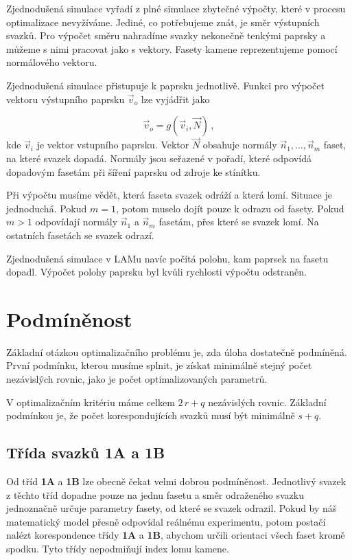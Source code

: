 Zjednodušená simulace vyřadí z plné simulace zbytečné výpočty, které v procesu optimalizace nevyžíváme. 
Jediné, co potřebujeme znát, je směr výstupních svazků. Pro výpočet směru nahradíme svazky nekonečně tenkými paprsky a můžeme s nimi pracovat jako s vektory. Fasety kamene reprezentujeme pomocí normálového vektoru. 

Zjednodušená simulace přistupuje k paprsku jednotlivě. Funkci pro výpočet vektoru vý\-stup\-ní\-ho paprsku $\vec{v}_o$ lze vyjádřit jako  

\begin{equation}
\vec{v}_o= g\left(\vec{v}_i,\vec{N} \right)\,,
\end{equation}
kde $\vec{v}_i$ je vektor vstupního paprsku. Vektor $\vec{N}$ obsahuje normály $\vec{n}_1,\dots,\vec{n}_m$ faset, na které svazek dopadá. Normály jsou seřazené v pořadí, které odpovídá dopadovým fasetám při šíření paprsku od zdroje ke stínítku. 

Při výpočtu musíme vědět, která faseta svazek odráží a která lomí. Situace je jednoduchá. Pokud $m = 1$, potom muselo dojít pouze k odrazu od fasety. Pokud  $m > 1$  odpovídají normály $\vec{n}_1$ a $\vec{n}_m$ fasetám, přes které se svazek lomí. Na ostatních fasetách se svazek odrazí. 

Zjednodušená simulace v LAMu navíc počítá polohu, kam paprsek na fasetu dopadl. Výpočet polohy paprsku byl kvůli rychlosti výpočtu odstraněn.



\section{Podmíněnost}
Základní otázkou optimalizačního problému je, zda úloha dostatečně podmíněná. První podmínku, kterou musíme splnit, je získat minimálně stejný počet nezávislých rovnic, jako je počet optimalizovaných parametrů. 

V optimalizačním kritériu máme celkem  $2\,r + q$ nezávislých rovnic. Základní podmínkou je, že počet korespondujících svazků musí být minimálně $ s+q $.

\subsection{Třída svazků \textbf{1A} a \textbf{1B}}
Od tříd \textbf{1A} a \textbf{1B} lze obecně čekat velmi dobrou podmíněnost. Jednotlivý svazek z těchto tříd dopadne pouze na jednu fasetu a směr odraženého svazku jednoznačně určuje parametry fasety, od které se svazek odrazil. Pokud by náš matematický model přesně odpovídal reálnému experimentu, potom postačí nalézt korespondence třídy \textbf{1A} a \textbf{1B}, abychom určili orientaci všech faset kromě spodku. Tyto třídy nepodmiňují index lomu kamene.
 
